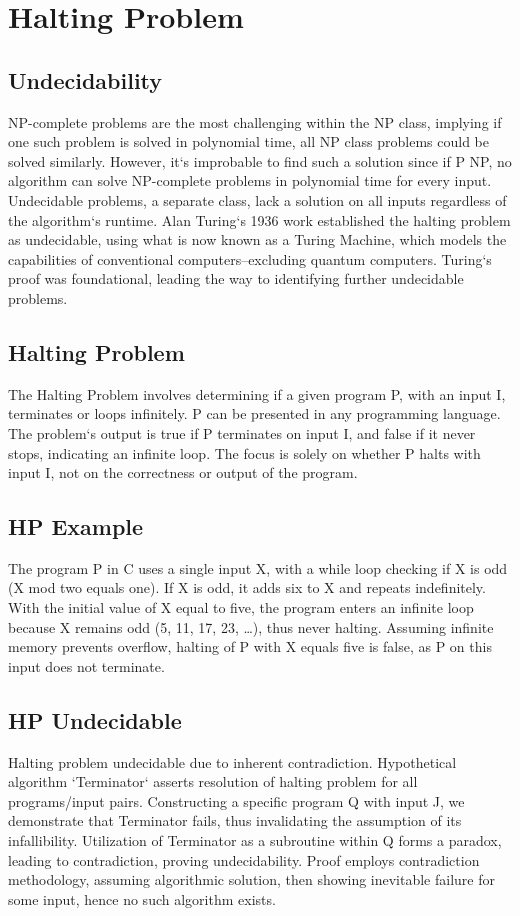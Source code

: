 \section*{Halting Problem}

\subsection*{Undecidability}
NP-complete problems are the most challenging within the NP class, implying if one such problem is solved in polynomial time, all NP class problems could be solved similarly.
However, it`s improbable to find such a solution since if P  NP, no algorithm can solve NP-complete problems in polynomial time for every input.
Undecidable problems, a separate class, lack a solution on all inputs regardless of the algorithm`s runtime.
Alan Turing`s 1936 work established the halting problem as undecidable, using what is now known as a Turing Machine, which models the capabilities of conventional computers--excluding quantum computers.
Turing`s proof was foundational, leading the way to identifying further undecidable problems.

\subsection*{Halting Problem}
The Halting Problem involves determining if a given program P, with an input I, terminates or loops infinitely.
P can be presented in any programming language.
The problem`s output is true if P terminates on input I, and false if it never stops, indicating an infinite loop.
The focus is solely on whether P halts with input I, not on the correctness or output of the program.

\subsection*{HP  Example}
The program P in C uses a single input X, with a while loop checking if X is odd (X mod two equals one).
If X is odd, it adds six to X and repeats indefinitely.
With the initial value of X equal to five, the program enters an infinite loop because X remains odd (5, 11, 17, 23, \ldots), thus never halting.
Assuming infinite memory prevents overflow, halting of P with X equals five is false, as P on this input does not terminate.

\subsection*{HP  Undecidable}
Halting problem undecidable due to inherent contradiction.
Hypothetical algorithm `Terminator` asserts resolution of halting problem for all programs/input pairs.
Constructing a specific program Q with input J, we demonstrate that Terminator fails, thus invalidating the assumption of its infallibility.
Utilization of Terminator as a subroutine within Q forms a paradox, leading to contradiction, proving undecidability.
Proof employs contradiction methodology, assuming algorithmic solution, then showing inevitable failure for some input, hence no such algorithm exists.

